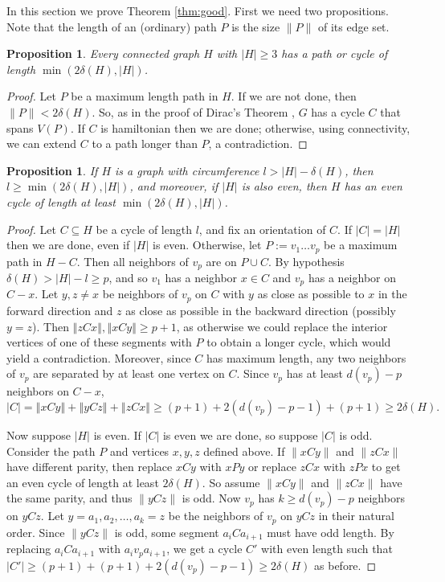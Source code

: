 \documentclass[oneside,12pt]{memoir}
\newtheorem{proposition}[theorem]{Proposition}
\begin{document}
In this section we prove Theorem \ref{thm:good}. First we need two
propositions. Note that the length of an (ordinary) path $P$ is the size $\|P\|$ of its edge set.
\begin{proposition}
\label{pro:LPath}Every connected graph $H$ with $|H|\geq 3$ has a path or cycle of
length $\min(2\delta(H),|H|)$. 
\end{proposition}
\begin{proof}
Let $P$ be a maximum length path in $H$.  If we are not done, then $\|P\| < 2\delta(H)$. So, as in the proof of Dirac's Theorem \cite{D}, 
$G$ has a cycle $C$ that spans $V(P)$. If $C$ is hamiltonian then we are done; otherwise, using connectivity, we can extend $C$ to a path longer than $P$, a contradiction.
\end{proof}
\begin{proposition}
\label{pro:LCyc}If $H$ is a graph with circumference $l>|H|-\delta(H)$,
then $l\geq\min(2\delta(H),|H|)$, and moreover, if $|H|$
is also even, then $H$ has an even cycle of length at least $\min(2\delta(H),|H|)$.\end{proposition}
\begin{proof}
Let $C\subseteq H$ be a cycle of length $l$, and
fix an orientation of $C$. If $|C|=|H|$ then we are done, even if
$|H|$ is even. Otherwise, let $P:=v_{1}\dots v_{p}$ be a maximum
path in $H-C$. Then all neighbors of $v_{p}$ are on $P\cup C$.
By hypothesis $\delta(H)>|H|-l\geq p$, and so $v_{1}$ has a neighbor
$x\in C$ and $v_{p}$ has a neighbor on $C-x$. Let $y,z\neq x$ be neighbors
of $v_{p}$ on $C$ with $y$ as close as possible to $x$ in the
forward direction and $z$ as close as possible in the backward direction
(possibly $y=z$). Then $\left\Vert zCx\right\Vert ,\left\Vert xCy\right\Vert \geq p+1$,
as otherwise we could replace the interior vertices of one of these segments
with $P$ to obtain a longer cycle, which would yield a contradiction. Moreover, since $C$ has maximum length, any two neighbors of $v_{p}$ are separated by
at least one vertex on $C$. Since $v_{p}$ has at least $d(v_{p})-p$
neighbors on $C-x$, \[
|C|=\left\Vert xCy\right\Vert +\left\Vert yCz\right\Vert +\left\Vert zCx\right\Vert \geq(p+1)+2(d(v_{p})-p-1)+(p+1)\geq2\delta(H).\]


Now suppose $|H|$ is even. If $|C|$ is even we are done, so suppose
$|C|$ is odd. Consider the path $P$ and vertices $x,y,z$ defined
above. If $\|xCy\|$ and $\|zCx\|$ have different parity, then replace
$xCy$ with $xPy$ or replace $zCx$ with $zPx$ to get an even cycle
of length at least $2\delta(H)$. So assume $\|xCy\|$ and $\|zCx\|$
have the same parity, and thus $\|yCz\|$ is odd. Now $v_{p}$ has
$k\geq d(v_{p})-p$ neighbors on $yCz$. Let $y=a_{1},a_{2},\dots,a_{k}=z$
be the neighbors of $v_{p}$ on $yCz$ in their natural order. Since
$\|yCz\|$ is odd, some segment $a_{i}Ca_{i+1}$ must have odd length.
By replacing $a_{i}Ca_{i+1}$ with $a_{i}v_{p}a_{i+1}$, we get a
cycle $C'$ with even length such that $|C'|\geq(p+1)+(p+1)+2(d(v_{p})-p-1)\geq2\delta(H)$ as before. 
\end{proof}
\end{document}

